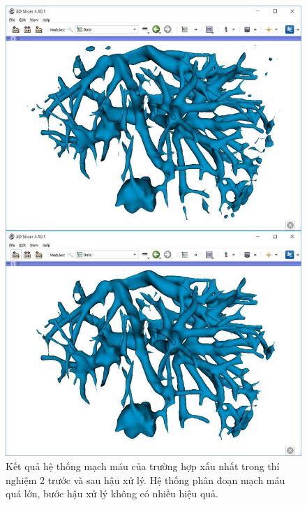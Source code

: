 	\begin{figure}[h!]
		\includegraphics[width=\textwidth, height=0.925\textheight]{figures/result_e2_worst_prediction_post_processing}
		\caption[Kết quả hệ thống mạch máu của trường hợp xấu nhất trong thí nghiệm 2.]{Kết quả hệ thống mạch máu của trường hợp xấu nhất trong thí nghiệm 2 trước và sau hậu xử lý. Hệ thống phân đoạn mạch máu quá lớn, bước hậu xử lý không có nhiều hiệu quả.}
		\label{fig:result_e2_worst_prediction_post_processing}
	\end{figure}
